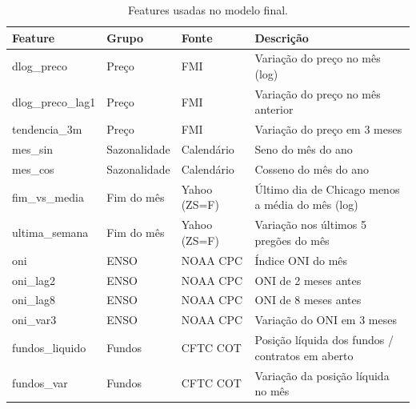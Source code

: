 \begin{table}
\caption{Features usadas no modelo final.}
\label{tab:tab1_features}
\begin{tabular}{llll}
\toprule
Feature & Grupo & Fonte & Descrição \\
\midrule
dlog\_preco & Preço & FMI & Variação do preço no mês (log) \\
dlog\_preco\_lag1 & Preço & FMI & Variação do preço no mês anterior \\
tendencia\_3m & Preço & FMI & Variação do preço em 3 meses \\
mes\_sin & Sazonalidade & Calendário & Seno do mês do ano \\
mes\_cos & Sazonalidade & Calendário & Cosseno do mês do ano \\
fim\_vs\_media & Fim do mês & Yahoo (ZS=F) & Último dia de Chicago menos a média do mês (log) \\
ultima\_semana & Fim do mês & Yahoo (ZS=F) & Variação nos últimos 5 pregões do mês \\
oni & ENSO & NOAA CPC & Índice ONI do mês \\
oni\_lag2 & ENSO & NOAA CPC & ONI de 2 meses antes \\
oni\_lag8 & ENSO & NOAA CPC & ONI de 8 meses antes \\
oni\_var3 & ENSO & NOAA CPC & Variação do ONI em 3 meses \\
fundos\_liquido & Fundos & CFTC COT & Posição líquida dos fundos / contratos em aberto \\
fundos\_var & Fundos & CFTC COT & Variação da posição líquida no mês \\
\bottomrule
\end{tabular}
\end{table}

